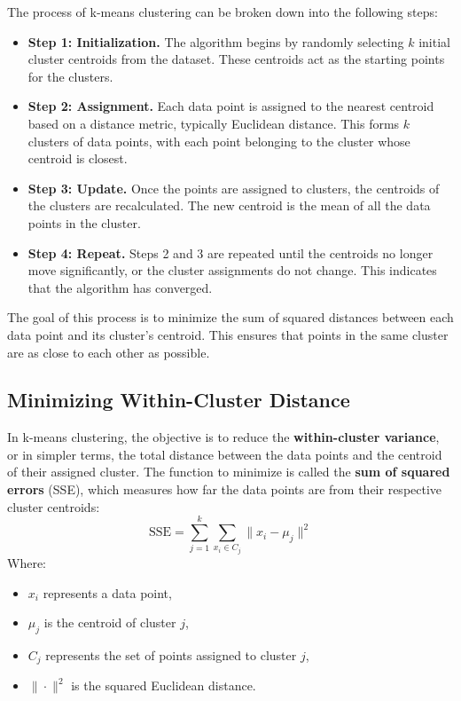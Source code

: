     The process of k-means clustering can be broken down into the following steps:
    \begin{itemize}
        \item \textbf{Step 1: Initialization.} The algorithm begins by randomly selecting \( k \) initial cluster centroids from the dataset. These centroids act as the starting points for the clusters.
        
        \item \textbf{Step 2: Assignment.} Each data point is assigned to the nearest centroid based on a distance metric, typically Euclidean distance. This forms \( k \) clusters of data points, with each point belonging to the cluster whose centroid is closest.
        
        \item \textbf{Step 3: Update.} Once the points are assigned to clusters, the centroids of the clusters are recalculated. The new centroid is the mean of all the data points in the cluster.
        
        \item \textbf{Step 4: Repeat.} Steps 2 and 3 are repeated until the centroids no longer move significantly, or the cluster assignments do not change. This indicates that the algorithm has converged.
    \end{itemize}

    The goal of this process is to minimize the sum of squared distances between each data point and its cluster’s centroid. This ensures that points in the same cluster are as close to each other as possible.

\subsection{Minimizing Within-Cluster Distance}
    \large In k-means clustering, the objective is to reduce the \textbf{within-cluster variance}, or in simpler terms, the total distance between the data points and the centroid of their assigned cluster. The function to minimize is called the \textbf{sum of squared errors} (SSE), which measures how far the data points are from their respective cluster centroids:
    \[
    \mathrm{SSE} = \sum_{j=1}^{k} \sum_{x_i \in C_j} \|x_i - \mu_j\|^2
    \]
    Where:
    \begin{itemize}
        \item \( x_i \) represents a data point,
        \item \( \mu_j \) is the centroid of cluster \( j \),
        \item \( C_j \) represents the set of points assigned to cluster \( j \),
        \item \( \|\cdot\|^2 \) is the squared Euclidean distance.
    \end{itemize}
    
